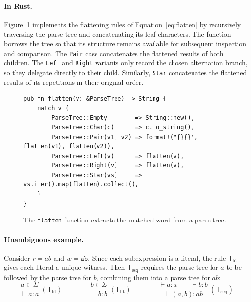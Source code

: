 %

\paragraph{In Rust.}
Figure~\ref{fig:flatten-rust} 
implements the flattening rules of Equation~\eqref{eq:flatten} 
by recursively traversing the parse tree and concatenating its leaf characters.
The function borrows the tree 
so that its structure remains available for subsequent inspection and comparison.
The \texttt{Pair} case concatenates the flattened results of both children. 
The \texttt{Left} and \texttt{Right} variants 
only record the chosen alternation branch, 
so they delegate directly to their child. Similarly, 
\texttt{Star} concatenates the flattened results of its repetitions 
in their original order.
\begin{figure}[H]
\small
\begin{verbatim}
pub fn flatten(v: &ParseTree) -> String {
    match v {
        ParseTree::Empty        => String::new(),
        ParseTree::Char(c)      => c.to_string(),
        ParseTree::Pair(v1, v2) => format!("{}{}", flatten(v1), flatten(v2)),
        ParseTree::Left(v)      => flatten(v),
        ParseTree::Right(v)     => flatten(v),
        ParseTree::Star(vs)     => vs.iter().map(flatten).collect(),
    }
}
\end{verbatim}
\caption{The \texttt{flatten} function extracts the matched word from a parse tree.}
\label{fig:flatten-rust}
\end{figure}

%

\clearpage
\paragraph{Unambiguous example.}
\label{par:unambigious-example}
Consider $r = ab$ and $w = \mathtt{ab}$. 
Since each subexpression is a literal, the rule $\mathsf{T}_{\mathrm{lit}}$ 
gives each literal a unique witness.
Then $\mathsf{T}_{\mathrm{seq}}$ requires the parse tree for $a$ 
to be followed by the parse tree for $b$,
combining them into a parse tree for $ab$:
\begin{equation}\label{eq:mvp-6}
\dfrac{a \in \Sigma}{\vdash a : a}\;(\mathsf{T}_{\mathrm{lit}})
\qquad\qquad
\dfrac{b \in \Sigma}{\vdash b : b}\;(\mathsf{T}_{\mathrm{lit}})
\qquad\qquad
\dfrac{
  \vdash a : a \qquad \vdash b : b
}{
  \vdash (a,b) : ab
}\;(\mathsf{T}_{\mathrm{seq}})
\end{equation}

